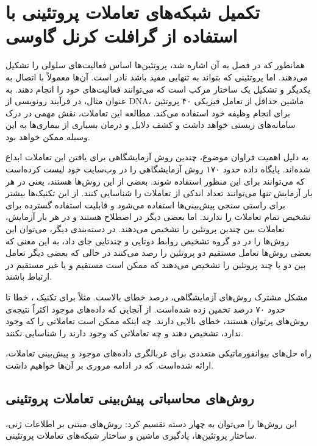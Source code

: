 \chapter{تکمیل شبکه‌های تعاملات پروتئینی با استفاده از گرافلت کرنل گاوسی}\label{chap:network-completion-problem-ppi}
همانطور که در فصل  به آن اشاره شد، پروتئین‌ها اساس فعالیت‌های سلولی را تشکیل می‌دهند. اما پروتئینی که بتواند به تنهایی مفید باشد نادر است. آن‌ها معمولاً با اتصال به یکدیگر و تشکیل یک ساختار مرکب است که می‌توانند فعالیت‌های خود را انجام ‌دهند. به عنوان مثال، در فرآیند رونویسی از DNA، ماشین  حداقل از تعامل فیزیکی ۴۰ پروتئین برای انجام وظیفه خود استفاده می‌کند. مطالعه این تعاملات، نقش مهمی در درک سامانه‌های زیستی خواهد داشت و کشف دلایل و درمان بسیاری از بیماری‌ها به این وسیله ممکن خواهد بود.

به دلیل اهمیت فراوان موضوع، چندین روش آزمایشگاهی برای یافتن این تعاملات ابداع شده‌اند. پایگاه داده  حدود ۱۷۰ روش آزمایشگاهی را در وب‌سایت خود لیست کرده‌است که می‌توانند برای این منظور استفاده شوند. بعضی از این روش‌ها  هستند، یعنی در هر بار آزمایش تنها می‌توانند تعداد اندکی از تعاملات را شناسایی کنند. از این تکنیک‌ها بیشتر برای راستی سنجی پیش‌بینی‌ها استفاده می‌شود و قابلیت استفاده گسترده برای تشخیص تمام تعاملات را ندارند. اما بعضی دیگر در اصطلاح  هستند و در هر بار آزمایش، تعاملات بین چندین پروتئین را تشخیص می‌دهند. در دسته‌بندی دیگر، می‌توان این روش‌ها را در دو گروه تشخیص روابط دوتایی و چندتایی جای داد، به این معنی که بعضی روش‌ها تعامل مستقیم دو پروتئین را رصد می‌کنند در حالی که بعضی دیگر تعامل بین دو یا چند پروتئین را تشخیص می‌دهند که ممکن است مستقیم و یا غیر مستقیم در ارتباط باشند.

مشکل مشترک روش‌های آزمایشگاهی، درصد خطای بالاست. مثلاً برای تکنیک ، خطا تا حدود ۷۰ درصد تخمین زده شده‌است. از آنجایی که داده‌های موجود اکثراً نتیجه‌ی روش‌های پرتوان هستند، خطای بالایی دارند. چه اینکه ممکن است تعاملاتی را که وجود ندارد، تشخیص دهند و چه تعاملاتی که وجود دارند را شناسایی نکنند.

راه حل‌های بیوانفورماتیکی متعددی برای غربالگری داده‌های موجود و پیش‌بینی تعاملات، ارائه شده‌است. که در ادامه مروری بر آن‌ها خواهیم داشت.

\section{روش‌های محاسباتی پیش‌بینی تعاملات پروتئینی}
این روش‌ها را می‌توان به چهار دسته تقسیم کرد: روش‌های مبتنی بر اطلاعات ژنی، ساختار پروتئین‌ها، یادگیری ماشین و ساختار شبکه‌های تعاملات پروتئینی.

